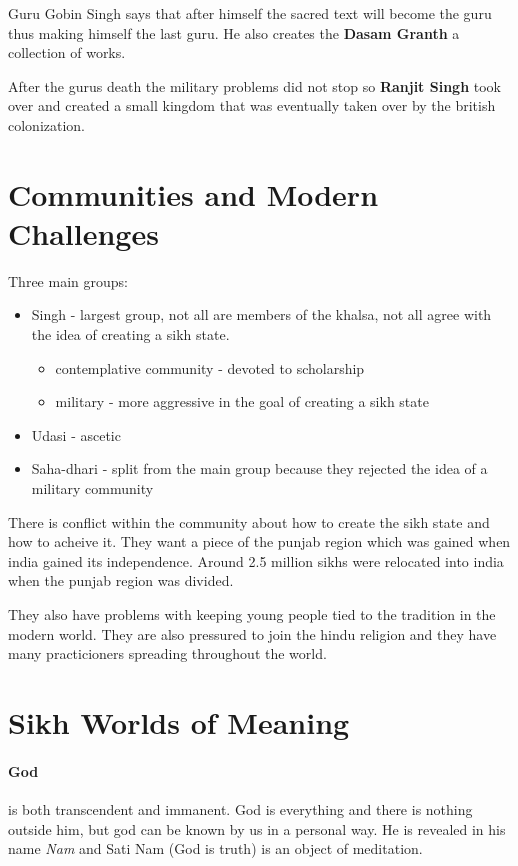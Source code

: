 \documentclass{article}
\begin{document}
Guru Gobin Singh says that after himself the sacred text will become the guru thus making himself the last guru. He also creates the \textbf{Dasam Granth} a collection of works.

After the gurus death the military problems did not stop so \textbf{Ranjit Singh} took over and created a small kingdom that was eventually taken over by the british colonization.

\section*{Communities and Modern Challenges}
\label{sec:communities_and_modern_challenges}
Three main groups:
\begin{itemize}
	\item Singh - largest group, not all are members of the khalsa, not all agree with the idea of creating a sikh state.
	\begin{itemize}
		\item contemplative community - devoted to scholarship
		\item military - more aggressive in the goal of creating a sikh state
	\end{itemize}
	\item Udasi - ascetic
	\item Saha-dhari - split from the main group because they rejected the idea of a military community
\end{itemize}

There is conflict within the community about how to create the sikh state and how to acheive it. They want a piece of the punjab region which was gained when india gained its independence. Around 2.5 million sikhs were relocated into india when the punjab region was divided.

They also have problems with keeping young people tied to the tradition in the modern world. They are also pressured to join the hindu religion and they have many practicioners spreading throughout the world.

\section*{Sikh Worlds of Meaning}
\label{sec:sikh_worlds_of_meaning}
\paragraph{God}
\label{par:god}
is both transcendent and immanent. God is everything and there is nothing outside him, but god can be known by us in a personal way. He is revealed in his name \emph{Nam} and Sati Nam (God is truth) is an object of meditation.
\end{document}
